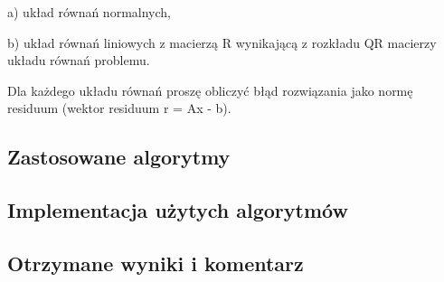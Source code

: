 \documentclass[11pt]{article} %
\begin{document}
a) układ równań normalnych,

b) układ równań liniowych z macierzą R wynikającą z rozkładu QR macierzy układu równań problemu.

Dla każdego układu równań proszę obliczyć błąd rozwiązania jako normę residuum (wektor residuum r = Ax - b).

\subsection{Zastosowane algorytmy}

\subsection{Implementacja użytych algorytmów}

\subsection{Otrzymane wyniki i komentarz}
\end{document}
